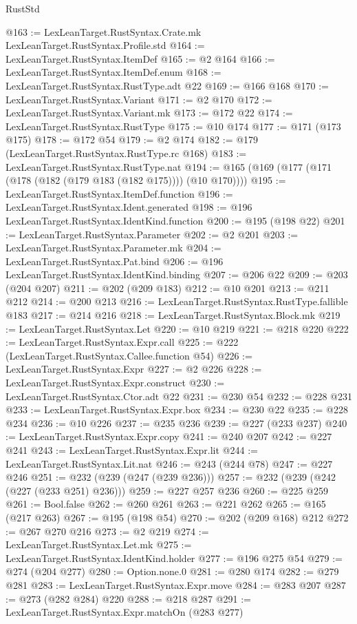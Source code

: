 \begin{lexlean}{RustStd}
\begin{coremodule}
{\begin{coremodule}
{{{{{{@163 := LexLeanTarget.RustSyntax.Crate.mk LexLeanTarget.RustSyntax.Profile.std
@164 := LexLeanTarget.RustSyntax.ItemDef
@165 := @2 @164
@166 := LexLeanTarget.RustSyntax.ItemDef.enum
@168 := LexLeanTarget.RustSyntax.RustType.adt @22
@169 := @166 @168
@170 := LexLeanTarget.RustSyntax.Variant
@171 := @2 @170
@172 := LexLeanTarget.RustSyntax.Variant.mk
@173 := @172 @22
@174 := LexLeanTarget.RustSyntax.RustType
@175 := @10 @174
@177 := @171 (@173 @175)
@178 := @172 @54
@179 := @2 @174
@182 := @179 (LexLeanTarget.RustSyntax.RustType.rc @168)
@183 := LexLeanTarget.RustSyntax.RustType.nat
@194 := @165 (@169 (@177 (@171 (@178 (@182 (@179 @183 (@182 @175)))) (@10 @170))))
@195 := LexLeanTarget.RustSyntax.ItemDef.function
@196 := LexLeanTarget.RustSyntax.Ident.generated
@198 := @196 LexLeanTarget.RustSyntax.IdentKind.function
@200 := @195 (@198 @22)
@201 := LexLeanTarget.RustSyntax.Parameter
@202 := @2 @201
@203 := LexLeanTarget.RustSyntax.Parameter.mk
@204 := LexLeanTarget.RustSyntax.Pat.bind
@206 := @196 LexLeanTarget.RustSyntax.IdentKind.binding
@207 := @206 @22
@209 := @203 (@204 @207)
@211 := @202 (@209 @183)
@212 := @10 @201
@213 := @211 @212
@214 := @200 @213
@216 := LexLeanTarget.RustSyntax.RustType.fallible @183
@217 := @214 @216
@218 := LexLeanTarget.RustSyntax.Block.mk
@219 := LexLeanTarget.RustSyntax.Let
@220 := @10 @219
@221 := @218 @220
@222 := LexLeanTarget.RustSyntax.Expr.call
@225 := @222 (LexLeanTarget.RustSyntax.Callee.function @54)
@226 := LexLeanTarget.RustSyntax.Expr
@227 := @2 @226
@228 := LexLeanTarget.RustSyntax.Expr.construct
@230 := LexLeanTarget.RustSyntax.Ctor.adt @22
@231 := @230 @54
@232 := @228 @231
@233 := LexLeanTarget.RustSyntax.Expr.box
@234 := @230 @22
@235 := @228 @234
@236 := @10 @226
@237 := @235 @236
@239 := @227 (@233 @237)
@240 := LexLeanTarget.RustSyntax.Expr.copy
@241 := @240 @207
@242 := @227 @241
@243 := LexLeanTarget.RustSyntax.Expr.lit
@244 := LexLeanTarget.RustSyntax.Lit.nat
@246 := @243 (@244 @78)
@247 := @227 @246
@251 := @232 (@239 (@247 (@239 @236)))
@257 := @232 (@239 (@242 (@227 (@233 @251) @236)))
@259 := @227 @257 @236
@260 := @225 @259
@261 := Bool.false
@262 := @260 @261
@263 := @221 @262
@265 := @165 (@217 @263)
@267 := @195 (@198 @54)
@270 := @202 (@209 @168) @212
@272 := @267 @270 @216
@273 := @2 @219
@274 := LexLeanTarget.RustSyntax.Let.mk
@275 := LexLeanTarget.RustSyntax.IdentKind.holder
@277 := @196 @275 @54
@279 := @274 (@204 @277)
@280 := Option.none.{0}
@281 := @280 @174
@282 := @279 @281
@283 := LexLeanTarget.RustSyntax.Expr.move
@284 := @283 @207
@287 := @273 (@282 @284) @220
@288 := @218 @287
@291 := LexLeanTarget.RustSyntax.Expr.matchOn (@283 @277)
}}}}}}
\end{coremodule}}
\end{coremodule}
\end{lexlean}

